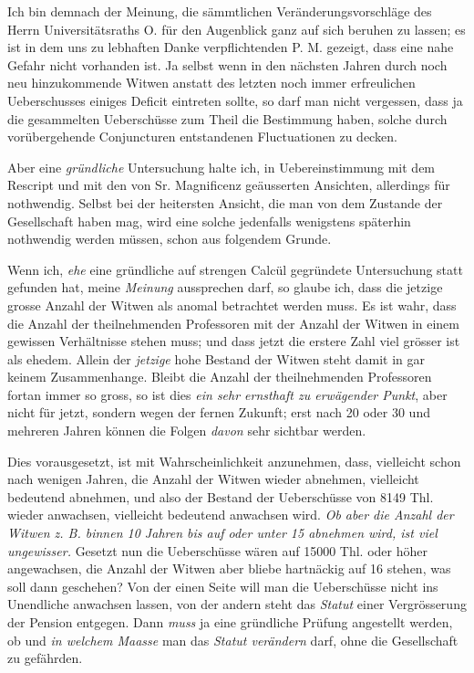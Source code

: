 \par{}
Ich bin demnach der Meinung, die sämmtlichen Veränderungsvorschläge des Herrn Universitätsraths O. für den Augenblick ganz auf sich beruhen zu lassen; es ist in dem uns zu lebhaften Danke verpflichtenden P. M. gezeigt, dass eine nahe Gefahr nicht vorhanden ist. Ja selbst wenn in den nächsten Jahren durch noch neu hinzukommende Witwen anstatt des letzten noch immer erfreulichen Ueberschusses einiges Deficit eintreten sollte, so darf man nicht vergessen, dass ja die gesammelten Ueberschüsse zum Theil die Bestimmung haben, solche durch vorübergehende Conjuncturen entstandenen Fluctuationen zu decken.

Aber eine \textit{gründliche} Untersuchung halte ich, in Uebereinstimmung mit dem Rescript und mit den von Sr. Magnificenz geäusserten Ansichten, allerdings für nothwendig. Selbst bei der heitersten Ansicht, die man von dem Zustande der Gesellschaft haben mag, wird eine solche jedenfalls wenigstens späterhin nothwendig werden müssen, schon aus folgendem Grunde.

Wenn ich, \textit{ehe} eine gründliche auf strengen Calcül gegründete Untersuchung statt gefunden hat, meine \textit{Meinung} aussprechen darf, so glaube ich, dass die jetzige grosse Anzahl der Witwen als anomal betrachtet werden muss. Es ist wahr, dass die Anzahl der theilnehmenden Professoren mit der Anzahl der Witwen in einem gewissen Verhältnisse stehen muss; und dass jetzt die erstere Zahl viel grösser ist als ehedem. Allein der \textit{jetzige} hohe Bestand der Witwen steht damit in gar keinem Zusammenhange. Bleibt die Anzahl der theilnehmenden Professoren fortan immer so gross, so ist dies \textit{ein sehr ernsthaft zu erwägender Punkt}, aber nicht für jetzt, sondern wegen der fernen Zukunft; erst nach 20 oder 30 und mehreren Jahren können die Folgen \textit{davon} sehr sichtbar werden.

Dies vorausgesetzt, ist mit Wahrscheinlichkeit anzunehmen, dass, vielleicht schon nach wenigen Jahren, die Anzahl der Witwen wieder abnehmen, vielleicht bedeutend abnehmen, und also der Bestand der Ueberschüsse von 8149 Thl. wieder anwachsen, vielleicht bedeutend anwachsen wird. \textit{Ob aber die Anzahl der Witwen z. B. binnen \textup{10} Jahren bis auf oder unter \textup{15} abnehmen wird, ist viel ungewisser.} Gesetzt nun die Ueberschüsse wären auf 15000 Thl. oder höher angewachsen, die Anzahl der Witwen aber bliebe hartnäckig auf 16 stehen, was soll dann geschehen? Von der einen Seite will man die Ueberschüsse nicht ins Unendliche anwachsen lassen, von der andern steht das \textit{Statut} einer Vergrösserung der Pension entgegen. Dann \textit{muss} ja eine gründliche Prüfung angestellt werden, ob und \textit{in welchem Maasse} man das \textit{Statut verändern} darf, ohne die Gesellschaft zu gefährden.

